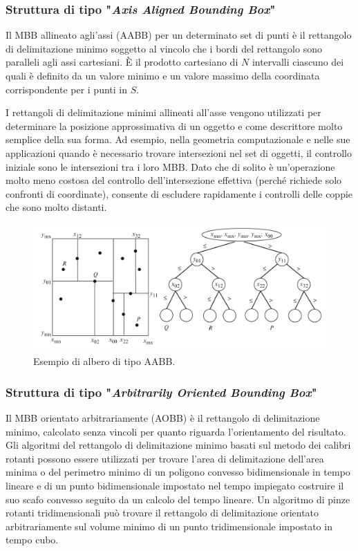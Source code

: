 \subsubsection{Struttura di tipo "\textit{Axis Aligned Bounding Box}"}
Il \ac{MBB} allineato agli'assi (\ac{AABB}) per un determinato set di punti è il rettangolo di delimitazione minimo soggetto al vincolo che i bordi del rettangolo sono paralleli agli assi cartesiani. È il prodotto cartesiano di $N$ intervalli ciascuno dei quali è definito da un valore minimo e un valore massimo della coordinata corrispondente per i punti in $S$.

I rettangoli di delimitazione minimi allineati all'asse vengono utilizzati per determinare la posizione approssimativa di un oggetto e come descrittore molto semplice della sua forma. Ad esempio, nella geometria computazionale e nelle sue applicazioni quando è necessario trovare intersezioni nel set di oggetti, il controllo iniziale sono le intersezioni tra i loro \ac{MBB}. Dato che di solito è un'operazione molto meno costosa del controllo dell'intersezione effettiva (perché richiede solo confronti di coordinate), consente di escludere rapidamente i controlli delle coppie che sono molto distanti.

\begin{figure}[h]
	\centering
	\includegraphics[width=\linewidth]{Figures/AABB}
	\caption{Esempio di albero di tipo AABB.}
	\label{AABB}
\end{figure}
%
\subsubsection{Struttura di tipo "\textit{Arbitrarily Oriented Bounding Box}"}
Il \ac{MBB} orientato arbitrariamente (\ac{AOBB}) è il rettangolo di delimitazione minimo, calcolato senza vincoli per quanto riguarda l'orientamento del risultato. Gli algoritmi del rettangolo di delimitazione minimo basati sul metodo dei calibri rotanti possono essere utilizzati per trovare l'area di delimitazione dell'area minima o del perimetro minimo di un poligono convesso bidimensionale in tempo lineare e di un punto bidimensionale impostato nel tempo impiegato costruire il suo scafo convesso seguito da un calcolo del tempo lineare. Un algoritmo di pinze rotanti tridimensionali può trovare il rettangolo di delimitazione orientato arbitrariamente sul volume minimo di un punto tridimensionale impostato in tempo cubo.
%
